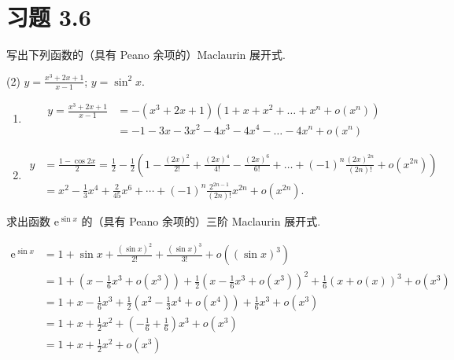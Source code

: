 \section{习题 3.6}

\begin{exercise}[3.6.1]
    写出下列函数的（具有 Peano 余项的）Maclaurin 展开式.
    \begin{tasks}(2)
        \task $y = \frac{x^3 + 2x + 1}{x - 1}$;
        \task $y = \sin^2 x$.
    \end{tasks}
\end{exercise}

\begin{solution}
    \begin{enumerate}
        \item \begin{align*}
                  y = \frac{x^3 + 2x + 1}{x - 1} & = -(x^3 + 2x + 1)(1 + x + x^2 + \dots + x^n + o(x^n))  \\
                                                 & = -1 - 3x - 3x^2 - 4x^3 - 4x^4 - \dots - 4x^n + o(x^n)
              \end{align*}
        \item \begin{align*}
                  y & = \frac{1-\cos 2x}{2} = \frac{1}{2} - \frac{1}{2}\left(1 - \frac{(2x)^2}{2!} + \frac{(2x)^4}{4!} - \frac{(2x)^6}{6!} + \dots + (-1)^n \frac{(2x)^{2n}}{(2n)!} + o(x^{2n})\right)\\
                    & = x^2 - \frac{1}{3}x^4 + \frac{2}{45}x^6 + \cdots + (-1)^n \frac{2^{2n-1}}{(2n)!} x^{2n} + o(x^{2n}).
              \end{align*}
    \end{enumerate}
\end{solution}

\begin{exercise}[3.6.2]
    求出函数 $\mathrm{e}^{\sin x}$ 的（具有 Peano 余项的）三阶 Maclaurin 展开式.
\end{exercise}

\begin{solution}
    \begin{align*}
        \mathrm{e}^{\sin x} & = 1 + \sin x + \frac{(\sin x)^2}{2!} + \frac{(\sin x)^3}{3!} + o((\sin x)^3)                                                                         \\
                            & = 1 + \left(x - \frac{1}{6}x^3 + o(x^3)\right) + \frac{1}{2}\left(x - \frac{1}{6}x^3 + o(x^3)\right)^2 + \frac{1}{6}\left(x + o(x)\right)^3 + o(x^3) \\
                            & = 1 + x - \frac{1}{6}x^3 + \frac{1}{2}\left(x^2 - \frac{1}{3}x^4 + o(x^4)\right) + \frac{1}{6}x^3 + o(x^3)                                           \\
                            & = 1 + x + \frac{1}{2}x^2 + \left(-\frac{1}{6} + \frac{1}{6}\right)x^3 + o(x^3)                                                                       \\
                            & = 1 + x + \frac{1}{2}x^2 + o(x^3)
    \end{align*}
\end{solution}

